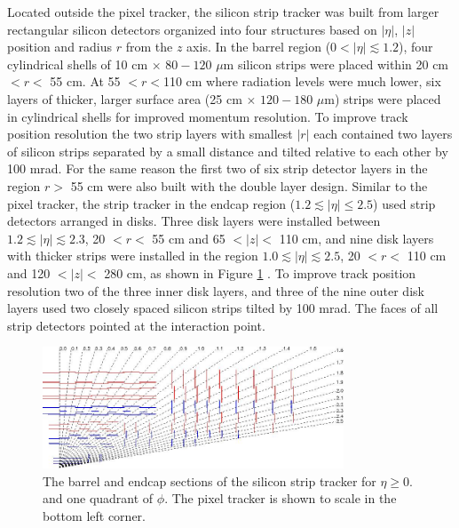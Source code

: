Located outside the pixel tracker, the silicon strip tracker was built from larger rectangular silicon detectors 
organized into four structures based on $|\eta|$, $|z|$ position and radius $r$ from the $z$ axis.  In the barrel region 
($0 < |\eta| \lesssim 1.2$), four cylindrical shells of 10 cm $\times$ $80-120$ $\mu$m silicon strips were placed within 20 cm $< r <$ 55 cm.  At
55 $< r < $110 cm where radiation levels were much lower, six layers of thicker, larger surface area (25 cm $\times$ $120-180$ $\mu$m) 
strips were placed in cylindrical shells for improved momentum resolution.  To improve track position resolution the two strip layers with smallest 
$|r|$ each contained two layers of silicon strips separated by a small distance and tilted relative 
to each other by 100 mrad.  For the same reason the first two of six strip detector layers in the region $r >$ 55 cm 
were also built with the double layer design.  Similar to the pixel tracker, the strip tracker in the endcap region 
($1.2 \lesssim |\eta| \leq 2.5$) used strip detectors arranged in disks.  Three disk layers were installed between 
$1.2 \lesssim |\eta| \lesssim 2.3$, 20 $< r <$ 55 cm and 65 $< |z| <$ 110 cm, and nine disk layers with thicker strips were installed in 
the region $1.0 \lesssim |\eta| \lesssim 2.5$, 20 $< r <$ 110 cm and 120 $< |z| < $ 280 cm, as shown in Figure \ref{fig:stripTracker} \cite{cmsTDR}.  
To improve track position resolution two of the three inner disk layers, and three of the nine outer disk layers 
used two closely spaced silicon strips tilted by 100 mrad.  The faces of all strip detectors pointed at the interaction 
point.

\begin{figure}[ht]
	\centering
	\includegraphics[width=0.8\textwidth]{figures/siliconStripAndPixelDetectorTwoDimView.png}
	\caption{The barrel and endcap sections of the silicon strip tracker for $\eta \geq 0.$ and one quadrant of $\phi$.  The pixel tracker is shown to scale in the bottom left corner.}
	\label{fig:stripTracker}
\end{figure}

